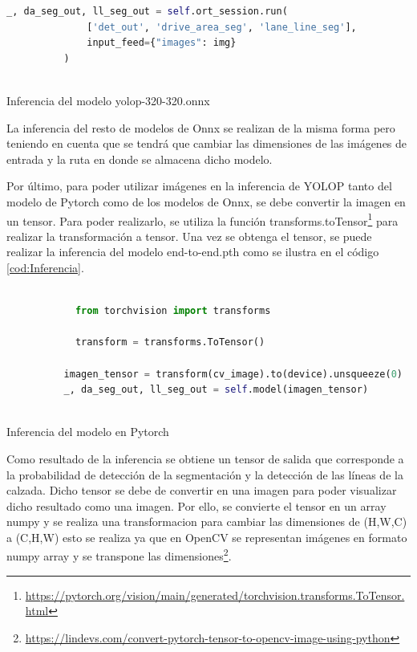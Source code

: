         \begin{code}[h]
          \begin{lstlisting}[language=Python]
            _, da_seg_out, ll_seg_out = self.ort_session.run(
              ['det_out', 'drive_area_seg', 'lane_line_seg'],
              input_feed={"images": img}
          )
        
          \end{lstlisting}
          \caption[Inferencia del modelo yolop-320-320.onnx]{Inferencia del modelo yolop-320-320.onnx}
          \label{cod:Inferencia_onnx}
          \end{code}  

        La inferencia del resto de modelos de Onnx se realizan de la misma forma pero teniendo en cuenta que se tendrá que cambiar las dimensiones de las imágenes de entrada y la ruta
        en donde se almacena dicho modelo. \newline

        Por último, para poder utilizar imágenes en la inferencia de YOLOP tanto del modelo de Pytorch como de los modelos de Onnx, se debe convertir la imagen en un tensor. Para poder realizarlo, se utiliza la función transforms.toTensor\footnote{\url{https://pytorch.org/vision/main/generated/torchvision.transforms.ToTensor.html}} 
        para realizar la transformación a tensor. Una vez se obtenga el tensor, se puede realizar la inferencia del modelo end-to-end.pth como se ilustra en el código \ref{cod:Inferencia}.
    
        \begin{code}[h]
          \begin{lstlisting}[language=Python]
         
            from torchvision import transforms
    
            transform = transforms.ToTensor() 
                        
          imagen_tensor = transform(cv_image).to(device).unsqueeze(0)
          _, da_seg_out, ll_seg_out = self.model(imagen_tensor)
        
          \end{lstlisting}
          \caption[Inferencia del modelo]{Inferencia del modelo en Pytorch}
          \label{cod:Inferencia}
          \end{code}  
    
        Como resultado de la inferencia se obtiene un tensor de salida que corresponde a la probabilidad de detección de la segmentación
        y la detección de las líneas de la calzada. Dicho tensor se debe de convertir en una imagen para poder visualizar
        dicho resultado como una imagen. 
        Por ello, se convierte el tensor en un array numpy y se realiza una transformacion para cambiar las dimensiones de (H,W,C) 
        a (C,H,W) esto se realiza ya que en OpenCV se representan imágenes en formato numpy array y se transpone las dimensiones\footnote{\url{https://lindevs.com/convert-pytorch-tensor-to-opencv-image-using-python}}. 
    
